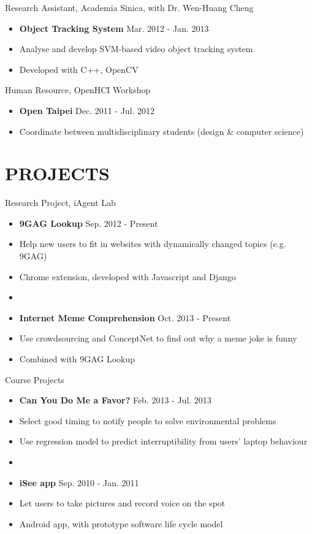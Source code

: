 \documentclass[margin]{resume}
\begin{document}
\begin{resume}
Research Assistant, Academia Sinica, with Dr. Wen-Huang Cheng
\begin{itemize} \itemsep -2pt
    \item[] {\bf Object Tracking System} \hfill Mar. 2012 - Jan. 2013
    \item[] Analyse and develop SVM-based video object tracking system
    \item[] Developed with C++, OpenCV
\end{itemize}

Human Resource, OpenHCI Workshop
\begin{itemize} \itemsep -2pt
    \item[] {\bf Open Taipei} \hfill Dec. 2011 - Jul. 2012
    \item[] Coordinate between multidisciplinary students (design \& computer science)
\end{itemize}


\section{PROJECTS}
Research Project, iAgent Lab
\begin{itemize} \itemsep -2pt
    \item[] {\bf 9GAG Lookup} \hfill Sep. 2012 - Present
    \item[] Help new users to fit in websites with dynamically changed topics (e.g. 9GAG)
    \item[] Chrome extension, developed with Javascript and Django
    \item[]
    \item[] {\bf Internet Meme Comprehension} \hfill Oct. 2013 - Present
    \item[] Use crowdsourcing and ConceptNet to find out why a meme joke is funny
    \item[] Combined with 9GAG Lookup
\end{itemize}

Course Projects
\begin{itemize} \itemsep -2pt
    \item[] {\bf Can You Do Me a Favor?} \hfill Feb. 2013 - Jul. 2013
    \item[] Select good timing to notify people to solve environmental problems
    \item[] Use regression model to predict interruptibility from users' laptop behaviour
    \item[]
    \item[] {\bf iSee app} \hfill Sep. 2010 - Jan. 2011
    \item[] Let users to take pictures and record voice on the spot
    \item[] Android app, with prototype software life cycle model
\end{itemize}



\end{resume}
\end{document}
